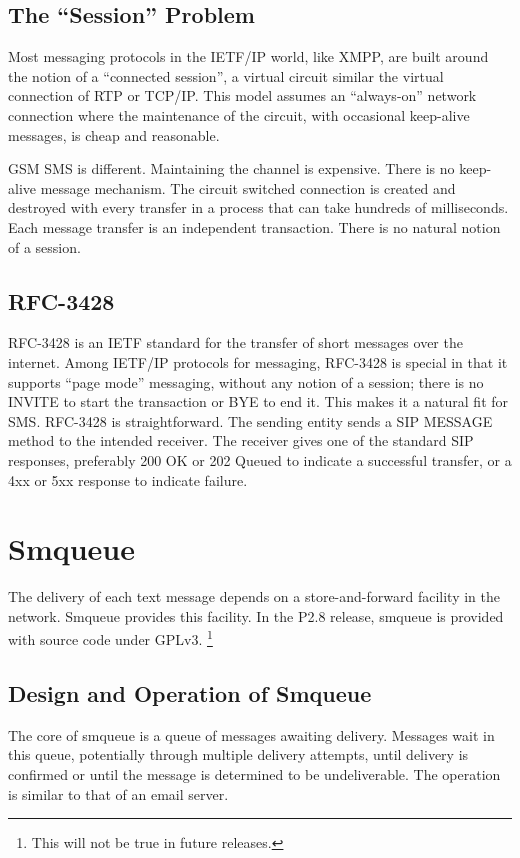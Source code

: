 \documentclass[11pt,openany]{book}
\begin{document}
\subsection{The ``Session'' Problem}
Most messaging protocols in the IETF/IP world, like XMPP, are built around the notion of a ``connected session'', a virtual circuit similar the virtual connection of RTP or TCP/IP.  This model assumes an ``always-on'' network connection where the maintenance of the circuit, with occasional keep-alive messages, is cheap and reasonable.

GSM SMS is different.  Maintaining the channel is expensive. There is no keep-alive message mechanism.  The circuit switched connection is created and destroyed with every transfer in a process that can take hundreds of milliseconds.  Each message transfer is an independent transaction.  There is no natural notion of a session.

\subsection{RFC-3428}
RFC-3428 is an IETF standard for the transfer of short messages over the internet.
Among IETF/IP protocols for messaging, RFC-3428 is special in that it supports ``page mode'' messaging, without any notion of a session; there is no INVITE to start the transaction or BYE to end it.  This makes it a natural fit for SMS.  RFC-3428 is straightforward.  The sending entity sends a SIP MESSAGE method to the intended receiver.  The receiver gives one of the standard SIP responses, preferably 200 OK or 202 Queued to indicate a successful transfer, or a 4xx or 5xx response to indicate failure.


\section{Smqueue}
The delivery of each text message depends on a store-and-forward facility in the network.
Smqueue provides this facility.
In the P2.8 release, smqueue is provided with source code under GPLv3.%
\footnote{This will not be true in future releases.}

\subsection{Design and Operation of Smqueue}
The core of smqueue is a queue of messages awaiting delivery.  Messages wait in this queue, potentially through multiple delivery attempts, until delivery is confirmed or until the message is determined to be undeliverable.  The operation is similar to that of an email server.
\end{document}
